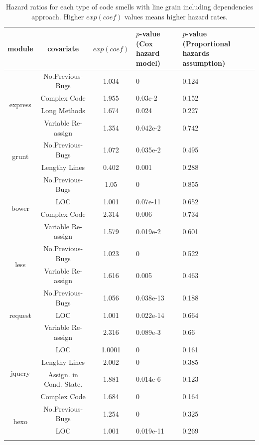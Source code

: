 \begin{table}[t]
	\centering
	\scriptsize
	\caption{Hazard ratios for each type of code smells with line grain including dependencies approach. Higher $exp(coef)$ values means higher hazard rates.}
	\begin{tabular}{c|c|c|p{2cm}|p{2cm}}
		\hline
		module & covariate & $exp(coef)$ & $p$-value (Cox hazard model) & $p$-value (Proportional hazards assumption) \\ \hline
		\multirow{4}{*}{express}
		& No.Previous-Bugs & 1.034 & 0 & 0.124 \\ \cline{2-5}
		& Complex Code & 1.955 & 0.03e-2 & 0.152 \\ \cline{2-5}
		& Long Methods & 1.674 & 0.024 & 0.227 \\ \cline{2-5}
		& Variable Re-assign & 1.354 & 0.042e-2 & 0.742 \\ \hline
		\multirow{2}{*}{grunt} 
		& No.Previous-Bugs & 1.072 & 0.035e-2 & 0.495 \\ \cline{2-5}
		& Lengthy Lines & 0.402 & 0.001 & 0.288 \\ \hline
		\multirow{4}{*}{bower}
		& No.Previous-Bugs & 1.05 & 0 & 0.855 \\ \cline{2-5}
		& LOC & 1.001 & 0.07e-11 & 0.652 \\ \cline{2-5}
		& Complex Code & 2.314 & 0.006 & 0.734 \\ \cline{2-5}
		& Variable Re-assign & 1.579 & 0.019e-2 & 0.601 \\ \hline
		\multirow{2}{*}{less}
		& No.Previous-Bugs & 1.023 & 0 & 0.522 \\ \cline{2-5}
		& Variable Re-assign & 1.616 & 0.005 & 0.463 \\ \hline
		\multirow{3}{*}{request}
		& No.Previous-Bugs & 1.056 & 0.038e-13 & 0.188 \\ \cline{2-5}
		& LOC & 1.001 & 0.022e-14 & 0.664 \\ \cline{2-5}
		& Variable Re-assign & 2.316 & 0.089e-3 & 0.66 \\ \hline
		\multirow{4}{*}{jquery}
		& LOC & 1.0001 & 0 & 0.161 \\ \cline{2-5}
		& Lengthy Lines & 2.002 & 0 & 0.385 \\ \cline{2-5}
		& Assign. in Cond. State. & 1.881 & 0.014e-6 & 0.123 \\ \cline{2-5}
		& Complex Code & 1.684 & 0 & 0.164 \\ \hline
		\multirow{3}{*}{hexo}
		& No.Previous-Bugs & 1.254 & 0 & 0.325 \\ \cline{2-5}
		& LOC & 1.001 & 0.019e-11 & 0.269 \\ \cline{2-5}

\end{tabular}
\end{table}
